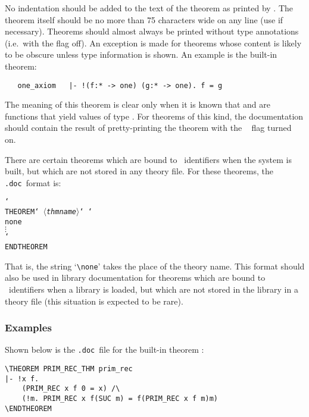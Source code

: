 \documentclass[12pt]{article}
\def\doc{{\tt .doc}}
\def\vsp{{\tt\char`\ }}
\def\bk{{\tt\char`\\ }}
\def\meta#1{\(\langle\){\it #1}\(\rangle\)}
\begin{document}
\noindent No indentation should be added to the text of the theorem as printed
by \HOL.  The theorem itself should be no more than 75 characters wide on any
line (use  if necessary).  Theorems should almost always be
printed without type annotations (i.e.\ with the  flag off).
An exception is made for theorems whose content is likely to be obscure unless
type information is shown.  An example is the built-in theorem:

\begin{hol}\begin{verbatim}
   one_axiom   |- !(f:* -> one) (g:* -> one). f = g
\end{verbatim}\end{hol}

\noindent The meaning of this theorem is clear only when it is known that
 and  are functions that yield values of type .  For
theorems of this kind, the documentation should contain the result of
pretty-printing the theorem with the \ML\  flag turned on.

There are certain theorems which  are bound to \ML\ identifiers when the
system is built, but which are not stored in any theory file.  For these
theorems, the \doc\ format is:

\smallskip

\begin{boxed}\begin{alltt}
\bk{THEOREM}\vsp\meta{thmname}\vsp\bk{none}
\(\vdots\)
\bk{ENDTHEOREM}
\end{alltt}\end{boxed}

\smallskip

\noindent That is, the string `{\small\verb!\none!}' takes the place of the
theory name. This format should also be used in library documentation for
theorems which are bound to \ML\ identifiers when a library is loaded, but
which are not stored in the library in a theory file (this situation is
expected to be rare).

\subsubsection{Examples}

Shown below is the \doc\ file for the built-in theorem :

\smallskip

\begin{boxed}\begin{verbatim}
\THEOREM PRIM_REC_THM prim_rec
|- !x f.
    (PRIM_REC x f 0 = x) /\
    (!m. PRIM_REC x f(SUC m) = f(PRIM_REC x f m)m)
\ENDTHEOREM
\end{verbatim}\end{boxed}
\end{document}
